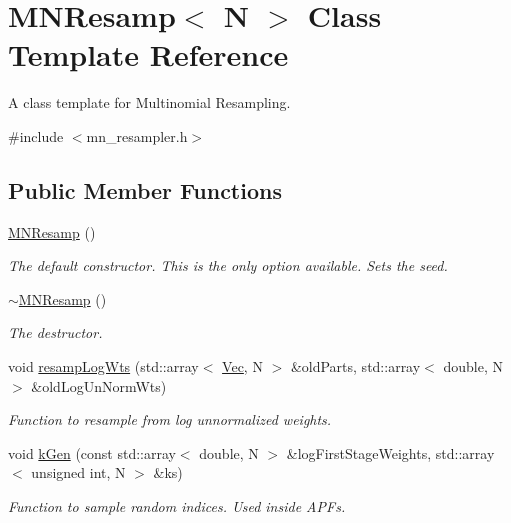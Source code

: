 \hypertarget{classMNResamp}{}\section{M\+N\+Resamp$<$ N $>$ Class Template Reference}
\label{classMNResamp}


A class template for Multinomial Resampling.  




{\ttfamily \#include $<$mn\+\_\+resampler.\+h$>$}

\subsection*{Public Member Functions}
\begin{DoxyCompactItemize}
\item 
\hyperlink{classMNResamp_a5b19989c7ebca4cf6d4cf5b5023714f9}{M\+N\+Resamp} ()\hypertarget{classMNResamp_a5b19989c7ebca4cf6d4cf5b5023714f9}{}\label{classMNResamp_a5b19989c7ebca4cf6d4cf5b5023714f9}

\begin{DoxyCompactList}\small\item\em The default constructor. This is the only option available. Sets the seed. \end{DoxyCompactList}\item 
\hyperlink{classMNResamp_ab7ec18956deafe46729f95003ec593a1}{$\sim$\+M\+N\+Resamp} ()\hypertarget{classMNResamp_ab7ec18956deafe46729f95003ec593a1}{}\label{classMNResamp_ab7ec18956deafe46729f95003ec593a1}

\begin{DoxyCompactList}\small\item\em The destructor. \end{DoxyCompactList}\item 
void \hyperlink{classMNResamp_a5c84e23bbe2f57984084835995dc41fd}{resamp\+Log\+Wts} (std\+::array$<$ \hyperlink{apf__filter_8h_a4c7df05c6f5e8a0d15ae14bcdbc07152}{Vec}, N $>$ \&old\+Parts, std\+::array$<$ double, N $>$ \&old\+Log\+Un\+Norm\+Wts)
\begin{DoxyCompactList}\small\item\em Function to resample from log unnormalized weights. \end{DoxyCompactList}\item 
void \hyperlink{classMNResamp_a152ee53e6df53587bea13bf8c9e74322}{k\+Gen} (const std\+::array$<$ double, N $>$ \&log\+First\+Stage\+Weights, std\+::array$<$ unsigned int, N $>$ \&ks)
\begin{DoxyCompactList}\small\item\em Function to sample random indices. Used inside A\+P\+Fs. \end{DoxyCompactList}\end{DoxyCompactItemize}


